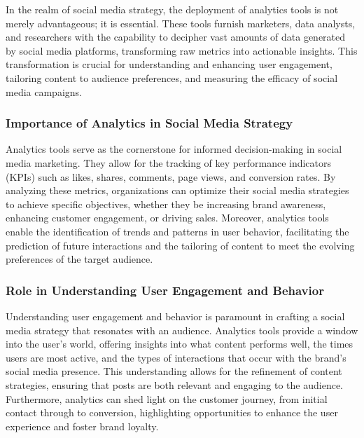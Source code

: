 \documentclass[
]{book}
\begin{document}
In the realm of social media strategy, the deployment of analytics tools is not merely advantageous; it is essential. These tools furnish marketers, data analysts, and researchers with the capability to decipher vast amounts of data generated by social media platforms, transforming raw metrics into actionable insights. This transformation is crucial for understanding and enhancing user engagement, tailoring content to audience preferences, and measuring the efficacy of social media campaigns.

\hypertarget{importance-of-analytics-in-social-media-strategy}{%
\subsubsection*{Importance of Analytics in Social Media Strategy}\label{importance-of-analytics-in-social-media-strategy}}

Analytics tools serve as the cornerstone for informed decision-making in social media marketing. They allow for the tracking of key performance indicators (KPIs) such as likes, shares, comments, page views, and conversion rates. By analyzing these metrics, organizations can optimize their social media strategies to achieve specific objectives, whether they be increasing brand awareness, enhancing customer engagement, or driving sales. Moreover, analytics tools enable the identification of trends and patterns in user behavior, facilitating the prediction of future interactions and the tailoring of content to meet the evolving preferences of the target audience.

\hypertarget{role-in-understanding-user-engagement-and-behavior}{%
\subsubsection*{Role in Understanding User Engagement and Behavior}\label{role-in-understanding-user-engagement-and-behavior}}

Understanding user engagement and behavior is paramount in crafting a social media strategy that resonates with an audience. Analytics tools provide a window into the user's world, offering insights into what content performs well, the times users are most active, and the types of interactions that occur with the brand's social media presence. This understanding allows for the refinement of content strategies, ensuring that posts are both relevant and engaging to the audience. Furthermore, analytics can shed light on the customer journey, from initial contact through to conversion, highlighting opportunities to enhance the user experience and foster brand loyalty.
\end{document}
